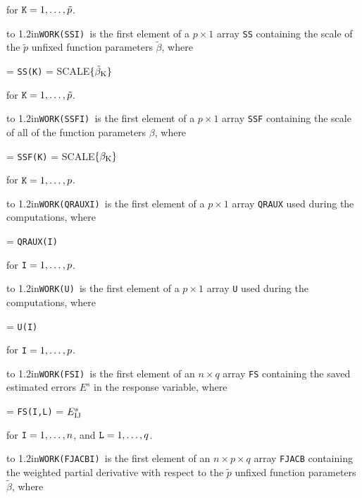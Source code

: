 \aligntobox  for ${\tt K} = 1,\ldots,\tilde{p}$.
\bigskip

\hangindent\wd\mybox{}\noindent\hbox to
1.2in{\hfill\tt WORK(SSI) }is the first element of a $p \times 1$ array {\tt SS} containing the scale of the $\tilde{p}$ unfixed function parameters
$\tilde{\beta}$, where

 = {\tt SS(K)} = {\smallcaps SCALE}$\{\tilde{\beta}_{\rm K}\}$

\aligntobox for ${\tt K} = 1,\ldots,\tilde{p}$.
\bigskip

\hangindent\wd\mybox{}\noindent\hbox to
1.2in{\hfill\tt WORK(SSFI) }is the first element of a $p \times 1$ array {\tt SSF} containing the scale of all of the function parameters $\beta$, where

 = {\tt SSF(K)} = {\smallcaps
SCALE}$\{\beta_{\rm K}\}$ 

\aligntobox for ${\tt K} = 1,\ldots,p$.
\bigskip

\hangindent\wd\mybox{}\noindent\hbox to
1.2in{\hfill\tt WORK(QRAUXI) }is the first element of a $p \times 1$ array {\tt QRAUX} used during the computations, where

 = {\tt QRAUX(I)}

\aligntobox for ${\tt I} = 1,\ldots,p$.
\bigskip

\hangindent\wd\mybox{}\noindent\hbox to
1.2in{\hfill\tt WORK(U) }is the first element of a $p \times 1$ array {\tt U} used during the computations, where

 = {\tt U(I)}

\aligntobox for ${\tt I} = 1,\ldots,p$.
\bigskip

\hangindent\wd\mybox{}\noindent\hbox to
1.2in{\hfill\tt WORK(FSI) }is the first element of an $n \times q$ array {\tt FS} containing the saved estimated errors $E^s$ in the response variable, where

 = {\tt FS(I,L)} = $E^s_{\rm IJ}$

\aligntobox for ${\tt I} = 1,\ldots,n$, and ${\tt L} = 1,\ldots,q$.
\bigskip

\hangindent\wd\mybox{}\noindent\hbox to
1.2in{\hfill\tt WORK(FJACBI) }is the first element of an $n\times p\times q$ array {\tt FJACB} containing the weighted partial derivative with respect to the $\tilde{p}$ unfixed function parameters $\tilde{\beta}$, where

